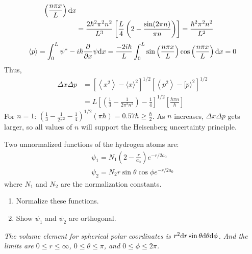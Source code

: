 \begin{solution}
\begin{align*}
        \left(\frac{n \pi x}{L}\right) \mathrm{d} x                                                                        \\
                             & =\frac{2 \hbar^{2} \pi^{2} n^{2}}{L^{3}}\left[\frac{L}{4}\left(2-\frac{\sin (2 \pi n)}
            {\pi n}\right)\right]=\frac{\hbar^{2} \pi^{2} n^{2}}{L^{2}}
    \end{align*}
    \begin{align*}
        \langle p\rangle=\int_{0}^{L} \psi^{*}-i \hbar \frac{\partial}{\partial x} \psi \mathrm{d} x=\frac{-2 i \hbar}{L}
        \int_{0}^{L} \sin \left(\frac{n \pi x}{L}\right)\cos \left(\frac{n \pi x}{L}\right) \mathrm{d} x=0
    \end{align*}
    Thus,
    \begin{align*}
        \Delta x \Delta p & =\left[\left\langle x^{2}\right\rangle-\langle x\rangle^{2}\right]^{1/2}\left[\left\langle p^{2}
        \right\rangle-[p\rangle^{2}\right]^{1 / 2}                                                                                                      \\
                          & =L\left[\left(\frac{1}{3}-\frac{1}{2 \pi^{2} n^{2}}\right)-\frac{1}{4}\right]^{1 / 2}\left[\frac{\hbar \pi n}{\hbar}\right]
    \end{align*}
    For $n=1$: $\left(\frac{1}{3}-\frac{1}{2 \pi^{2}}-\frac{1}{4}\right)^{1/2}(\pi\hbar)=0.57\hbar\geq\frac{\hbar}{2}$.
    As $n$ increases, $\Delta x \Delta p$ gets larger, so all values of $n$ will support the Heisenberg uncertainty principle.
\end{solution}

\item Two unnormalized functions of the hydrogen atoms are:
\begin{align*}
    \psi_1=N_1\left(2-\frac{r}{a_0}\right)e^{-r/2a_0} \\
    \psi_2=N_2r\sin\theta\cos\phi e^{-r/2a_0}
\end{align*}
where $N_1$ and $N_2$ are the normalization constants.
\begin{enumerate}
    \item Normalize these functions.
    \item Show $\psi_1$ and $\psi_2$ are orthogonal.
\end{enumerate}

\begin{tcolorbox}
    \textit{The volume element for spherical polar coordinates is $r^2\mathrm{d} r\sin\theta\mathrm{d}\theta\mathrm{d}\phi$. And the limits are
        $0\leq r\leq\infty$, $0\leq\theta\leq\pi$, and $0\leq\phi\leq2\pi$.}
\end{tcolorbox}

